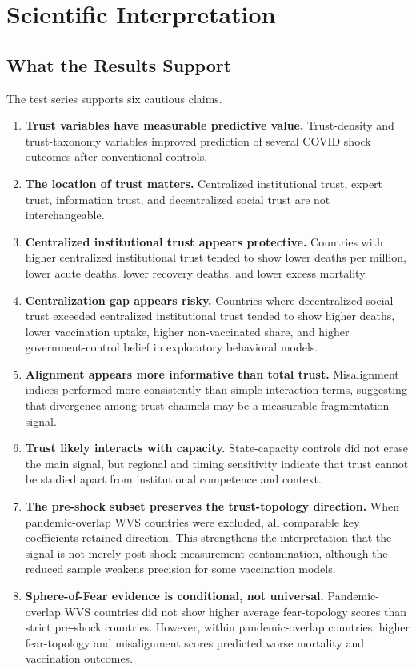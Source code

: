 \documentclass[12pt]{article}
\begin{document}
\section{Scientific Interpretation}

\subsection{What the Results Support}

The test series supports six cautious claims.

\begin{enumerate}
  \item \textbf{Trust variables have measurable predictive value.} Trust-density and trust-taxonomy variables improved prediction of several COVID shock outcomes after conventional controls.
  \item \textbf{The location of trust matters.} Centralized institutional trust, expert trust, information trust, and decentralized social trust are not interchangeable.
  \item \textbf{Centralized institutional trust appears protective.} Countries with higher centralized institutional trust tended to show lower deaths per million, lower acute deaths, lower recovery deaths, and lower excess mortality.
  \item \textbf{Centralization gap appears risky.} Countries where decentralized social trust exceeded centralized institutional trust tended to show higher deaths, lower vaccination uptake, higher non-vaccinated share, and higher government-control belief in exploratory behavioral models.
  \item \textbf{Alignment appears more informative than total trust.} Misalignment indices performed more consistently than simple interaction terms, suggesting that divergence among trust channels may be a measurable fragmentation signal.
  \item \textbf{Trust likely interacts with capacity.} State-capacity controls did not erase the main signal, but regional and timing sensitivity indicate that trust cannot be studied apart from institutional competence and context.
  \item \textbf{The pre-shock subset preserves the trust-topology direction.} When pandemic-overlap WVS countries were excluded, all comparable key coefficients retained direction. This strengthens the interpretation that the signal is not merely post-shock measurement contamination, although the reduced sample weakens precision for some vaccination models.
  \item \textbf{Sphere-of-Fear evidence is conditional, not universal.} Pandemic-overlap WVS countries did not show higher average fear-topology scores than strict pre-shock countries. However, within pandemic-overlap countries, higher fear-topology and misalignment scores predicted worse mortality and vaccination outcomes.
\end{enumerate}
\end{document}
